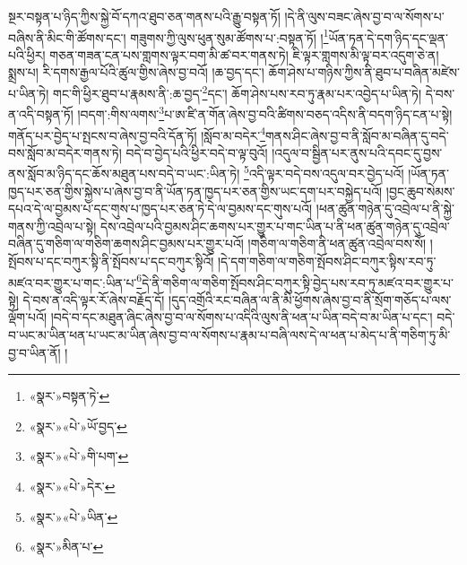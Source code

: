 སྔར་བསྟན་པ་ཉིད་ཀྱིས་སྐྱེ་བོ་དཀའ་ཐུབ་ཅན་གནས་པའི་རྒྱུ་བསྟན་ཏོ། །དེ་ནི་ལུས་བཟང་ཞེས་བྱ་བ་ལ་སོགས་པ་བཞིས་ནི་མིང་གི་ཚོགས་དང་། གཟུགས་ཀྱི་ལུས་ཕུན་སུམ་ཚོགས་པ་:བསྟན་ཏོ། །\footnote{«སྣར་»བསྟན་ཏེ་}ཡོན་ཏན་དེ་དག་ཉིད་དང་ལྡན་པའི་ཕྱིར། གཅན་གཟན་ངན་པས་གླགས་ལྟར་བག་མི་ཚ་བར་གནས་ཏེ། ཇི་ལྟར་གླགས་མི་ལྟ་བར་འདུག་ཅེ་ན། སྨྲས་པ། རི་དགས་རྒྱལ་པོའི་ཚུལ་གྱིས་ཞེས་བྱ་བའོ། །ཆ་བྱད་དང་། ཆོག་ཤེས་པ་གཉིས་ཀྱིས་ནི་ཐུབ་པ་བཞིན་མཛེས་པ་ཡིན་ཏེ། གང་གི་ཕྱིར་ཐུབ་པ་རྣམས་ནི་:ཆ་བྱད་\footnote{«སྣར་»«པེ་»ཡོ་བྱད་}དང་། ཆོག་ཤེས་པས་རབ་ཏུ་རྣམ་པར་འབྱེད་པ་ཡིན་ཏེ། དེ་བས་ན་འདི་བསྟན་ཏོ། །བདག་:གིས་ལགས་\footnote{«སྣར་»«པེ་»གི་པག་}པ་ཨ་ཛི་ན་གོན་ཞེས་བྱ་བའི་ཚིགས་བཅད་འདིས་ནི་བདག་ཉིད་ངན་པ་སྟེ། གནོད་པར་བྱེད་པ་སྤངས་བ་ཞེས་བྱ་བའི་དོན་ཏོ། །སློབ་མ་བདེར་\footnote{«སྣར་»«པེ་»དེར་}གནས་ཤིང་ཞེས་བྱ་བ་ནི་སློབ་མ་བཞིན་དུ་བདེ་བས་སློབ་མ་བདེར་གནས་ཏེ། བདེ་བ་བྱེད་པའི་ཕྱིར་བདེ་བ་ལྟ་བུའོ། །འདུལ་བ་སྦྱིན་པར་ནུས་པའི་དབང་དུ་བྱས་ནས་སློབ་མ་ཉིད་དང་ཆོས་མཐུན་པས་བདེ་བ་ཡང་:ཡིན་ཏེ། \footnote{«སྣར་»«པེ་»ཡིན་}འདི་ལྟར་བདེ་བས་འདུལ་བར་བྱེད་པའོ། །ཡོན་ཏན་ཁྱད་པར་ཅན་གྱིས་སྐྱེས་པ་ཞེས་བྱ་བ་ནི་ཡོན་ཏན་ཁྱད་པར་ཅན་གྱིས་ཡང་དག་པར་བསྐྱེད་པའོ། །བྱང་ཆུབ་སེམས་དཔའ་དེ་ལ་བྱམས་པ་དང་གུས་པ་ཁྱད་པར་ཅན་ཏེ་དེ་ལ་བྱམས་དང་གུས་པའོ། །ཕན་ཚུན་གཉེན་དུ་འབྲེལ་པ་ནི་སྐྱེ་གནས་ཀྱི་འབྲེལ་པ་སྟེ། དེས་འབྲེལ་པའི་བྱམས་ཤིང་ཆགས་པར་གྱུར་པ་གང་ཡིན་པ་ནི་ཕན་ཚུན་གཉེན་དུ་འབྲེལ་བཞིན་དུ་གཅིག་ལ་གཅིག་ཆགས་ཤིང་བྱམས་པར་གྱུར་པའོ། །གཅིག་ལ་གཅིག་ནི་ཕན་ཚུན་འབྲེལ་བས་སོ། །སྤོབས་པ་དང་བཀུར་སྟི་ནི་སྤོབས་པ་དང་བཀུར་སྟིའོ། །དེ་དག་གཅིག་ལ་གཅིག་སྤོབས་ཤིང་བཀུར་སྟིས་རབ་ཏུ་མཛའ་བར་གྱུར་པ་གང་:ཡིན་པ་\footnote{«སྣར་»མིན་པ་}དེ་ནི་གཅིག་ལ་གཅིག་སྤོབས་ཤིང་བཀུར་སྟི་བྱེད་པས་རབ་ཏུ་མཛའ་བར་གྱུར་པ་སྟེ། དེ་བས་ན་འདི་ལྟར་རོ་ཞེས་བརྗོད་དོ། །དུད་འགྲོའི་རང་བཞིན་ལ་ནི་མི་ཕྱོགས་ཞེས་བྱ་བ་ནི་སྲོག་གཅོད་པ་ལས་ལྡོག་པའོ། །བདེ་བ་དང་མཐུན་ཞིང་ཞེས་བྱ་བ་ལ་སོགས་པ་འདིའི་ལུས་ནི་ཕན་པ་ཡིན་བདེ་བ་མ་ཡིན་པ་དང་། བདེ་བ་ཡང་མ་ཡིན་ཕན་པ་ཡང་མ་ཡིན་ཞེས་བྱ་བ་ལ་སོགས་པ་རྣམ་པ་བཞི་ལས་དེ་ལ་ཕན་པ་མེད་པ་ནི་གཅིག་ཏུ་མི་བྱ་བ་ཡིན་ནོ། །
